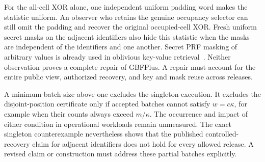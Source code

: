 For the all-cell XOR alone, one independent uniform padding word makes the
statistic uniform. An observer who retains the genuine occupancy selector
can still omit the padding and recover the original occupied-cell XOR.
Fresh uniform secret masks on the adjacent identifiers also hide this statistic
when the masks are independent of the identifiers and one another. Secret PRF
masking of arbitrary values is already used in oblivious key-value
retrieval~\cite{hao2024okvr}. Neither observation proves
a complete repair of GBFPlus. A repair must account for the entire public view,
authorized recovery, and key and mask reuse across releases.

A minimum batch size above one excludes the singleton execution. It excludes
the disjoint-position certificate only if accepted batches cannot satisfy
$w=c\kappa$, for example when their counts always exceed $m/\kappa$.
The occurrence and impact of either condition in operational workloads remain
unmeasured. The exact singleton counterexample nevertheless shows that the
published controlled-recovery claim for adjacent identifiers does not hold
for every allowed release. A revised claim or construction must address these
partial batches explicitly.
